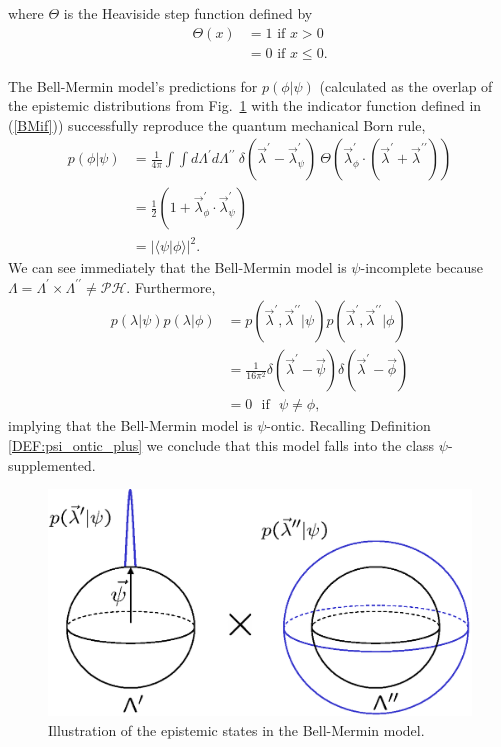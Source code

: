 \documentclass[aps,nofootinbib,12pt]{revtex4-2}
\begin{document}
where $\Theta$ is the Heaviside step function defined by
\begin{align*}
\Theta(x)  & =1\text{ if }x>0\\
& =0\text{ if }x\le 0.
\end{align*}


The Bell-Mermin model's predictions for $p(\phi|\psi)$ (calculated
as the overlap of the epistemic distributions from
Fig.~\ref{FIG:bmbs1and2} with the indicator function defined in
(\ref{BMif})) successfully reproduce the quantum mechanical Born
rule,
\begin{align}
p(\phi|\psi)  &
=\frac{1}{4\pi}\int\!\!\!\int{d}\Lambda^{\prime}{d}\Lambda
^{\prime\prime}\:\delta(\vec{\lambda}^{\prime}-\vec{\lambda}^{\prime}_{\psi
})\:\Theta(\vec{\lambda}^{\prime}_{\phi}\cdot(\vec{\lambda}^{\prime}%
+\vec{\lambda}^{\prime\prime}))\nonumber\\
&  =\frac{1}{2}\left(  1+\vec{\lambda}^{\prime}_{\phi}\cdot\vec{\lambda
}^{\prime}_{\psi}\right) \nonumber\\
&  =\left|  \langle\psi|\phi\rangle\right|  ^{2}.
\end{align}
We can see immediately that the Bell-Mermin model is
$\psi$-incomplete because
$\Lambda=\Lambda^{\prime}\times\Lambda^{\prime\prime}\neq\mathcal{PH}$.
Furthermore,
\begin{align}
p(\lambda|\psi)p(\lambda|\phi) &  =p(\vec{\lambda}^{\prime},\vec{\lambda
}^{\prime\prime}|\psi)p(\vec{\lambda}^{\prime},\vec{\lambda}^{\prime\prime
}|\phi)\nonumber\\
&  =\frac{1}{16\pi^{2}}\delta(\vec{\lambda}^{\prime}-\vec{\psi})\delta
(\vec{\lambda}^{\prime}-\vec{\phi})\nonumber\\
&  =0\:\:\:\text{if}\:\:\:\psi\neq\phi,
\end{align}
implying that the Bell-Mermin model is $\psi$-ontic. Recalling Definition
\ref{DEF:psi_ontic_plus} we conclude that this model falls into the class
$\psi$-supplemented.

\begin{figure}[t]
\includegraphics[scale=0.55]{bmbs1and2}\caption{Illustration of the epistemic
states in the Bell-Mermin model.} \label{FIG:bmbs1and2}
\end{figure}
\end{document}
